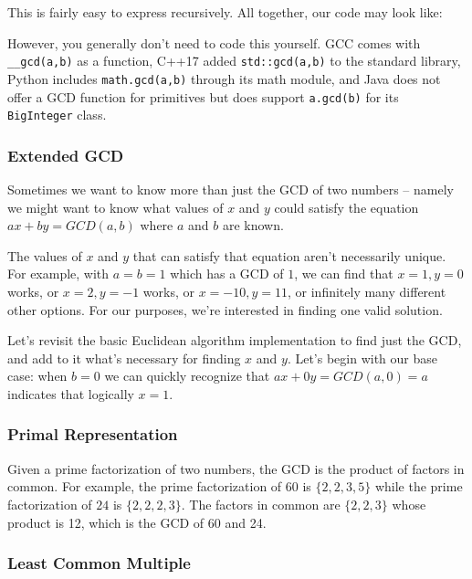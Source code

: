 This is fairly easy to express recursively. All together, our code may look like:


However, you generally don't need to code this yourself. GCC comes with \texttt{__gcd(a,b)} as a function, C++17 added \texttt{std::gcd(a,b)} to the standard library, Python includes \texttt{math.gcd(a,b)} through its math module, and Java does not offer a GCD function for primitives but does support \texttt{a.gcd(b)} for its \texttt{BigInteger} class.

\subsubsection{Extended GCD}

Sometimes we want to know more than just the GCD of two numbers -- namely we might want to know what values of $x$ and $y$ could satisfy the equation $ax + by = GCD(a,b)$ where $a$ and $b$ are known.

The values of $x$ and $y$ that can satisfy that equation aren't necessarily unique. For example, with $a = b = 1$ which has a GCD of $1$, we can find that $x = 1, y = 0$ works, or $x = 2, y = -1$ works, or $x = -10, y = 11$, or infinitely many different other options. For our purposes, we're interested in finding one valid solution.

Let's revisit the basic Euclidean algorithm implementation to find just the GCD, and add to it what's necessary for finding $x$ and $y$. Let's begin with our base case: when $b = 0$ we can quickly recognize that $ax + 0y = GCD(a,0) = a$ indicates that logically $x = 1$.


\subsubsection{Primal Representation}

Given a prime factorization of two numbers, the GCD is the product of factors in common. For example, the prime factorization of $60$ is $\{2,2,3,5\}$ while the prime factorization of $24$ is $\{2,2,2,3\}$. The factors in common are $\{2,2,3\}$ whose product is 12, which is the GCD of 60 and 24.

\subsubsection{Least Common Multiple}

